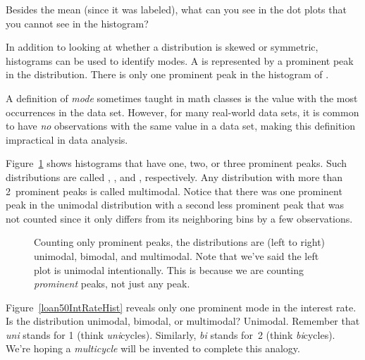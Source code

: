 \begin{exercisewrap}
\begin{nexercise}
Besides the mean (since it was labeled), what can you see
in the dot plots that you cannot see in the
histogram?\footnotemark{}
\end{nexercise}
\end{exercisewrap}

In addition to looking at whether a distribution is skewed
or symmetric, histograms can be used to identify modes.
A  is represented by a prominent peak in the
distribution.
There is only one prominent peak in the histogram of
.

A definition of \emph{mode} sometimes
taught in math classes is the value with the
most occurrences in the data set.
However, for many real-world data sets, it is common to have
\emph{no} observations with the same value in a data set,
making this definition impractical in data analysis.

Figure~\ref{singleBiMultiModalPlots} shows histograms that
have one, two, or three prominent peaks.
Such distributions are called
,
, and
, respectively.
Any distribution with more than 2~prominent peaks is
called multimodal.
Notice that there was one prominent peak in the unimodal
distribution with a second less prominent peak that was
not counted since it only differs from its neighboring
bins by a few observations.

\begin{figure}[h]
  \centering
  \caption{Counting only prominent peaks, the
      distributions are (left to right) unimodal,
      bimodal, and multimodal.
      Note that we've said the left plot is unimodal
      intentionally.
      This is because we are counting \emph{prominent}
      peaks, not just any peak.}
  \label{singleBiMultiModalPlots}
\end{figure}

\begin{examplewrap}
\begin{nexample}{Figure~\ref{loan50IntRateHist}
    reveals only one prominent mode in the interest rate.
    Is the distribution unimodal, bimodal, or multimodal?}
  Unimodal.
  Remember that \emph{uni} stands for 1 (think \emph{uni}cycles).
  Similarly, \emph{bi} stands for~2 (think \emph{bi}cycles).
  We're hoping a \emph{multicycle} will be invented to complete
  this analogy.
\end{nexample}
\end{examplewrap}

